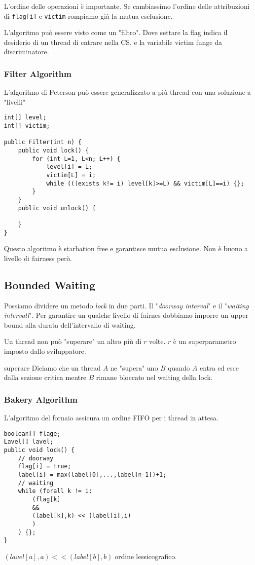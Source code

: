 \documentclass{article}
\begin{document}
L'ordine delle operazioni è importante. Se cambiassimo l'ordine delle attribuzioni di \texttt{flag[i]} e \texttt{victim} rompiamo già la mutua esclusione.

L'algoritmo può essere visto come un "filtro". Dove settare la flag indica il desiderio di un thread di entrare nella CS, e la variabile victim funge da discriminatore.

\subsubsection{Filter Algorithm}
L'algoritmo di Peterson può essere generalizzato a più thread con una soluzione a "livelli"
\begin{lstlisting}
int[] level;
int[] victim;

public Filter(int n) {
    public void lock() {
        for (int L=1, L<n; L++) {
            level[i] = L;
            victim[L] = i;
            while (((exists k!= i) level[k]>=L) && victim[L]==i) {};
        }
    }
    public void unlock() {

    }
}
\end{lstlisting}
Questo algoritmo è starbation free e garantisce mutua esclusione. Non è buono a livello di fairness però.

\subsection{Bounded Waiting}
Possiamo dividere un metodo \textit{lock} in due parti. Il "\textit{doorway interval}" e il "\textit{waiting intervall}". 
Per garantire un qualche livello di fairnes dobbiamo imporre un upper bound alla durata dell'intervallo di waiting.

Un thread non può "superare" un altro più di $r$ volte. $r$ è un superparametro imposto dallo sviluppatore.
\begin{callout}{superare}
    Diciamo che un thread $A$ ne "supera" uno $B$ quando $A$ entra ed esce dalla sezione critica mentre $B$ rimane bloccato nel waiting della lock.
\end{callout}

\subsubsection{Bakery Algorithm}
L'algoritmo del fornaio assicura un ordine FIFO per i thread in attesa.
\begin{lstlisting}
boolean[] flage;
Lavel[] lavel;
public void lock() {
    // doorway
    flag[i] = true;
    label[i] = max(label[0],...,label[n-1])+1;
    // waiting
    while (forall k != i:
        (flag[k] 
        && 
        (label[k],k) << (label[i],i)
        )
    ) {};
}
\end{lstlisting}
$(lavel[a],a) << (label[b],b)$ ordine lessicografico.
\end{document}
